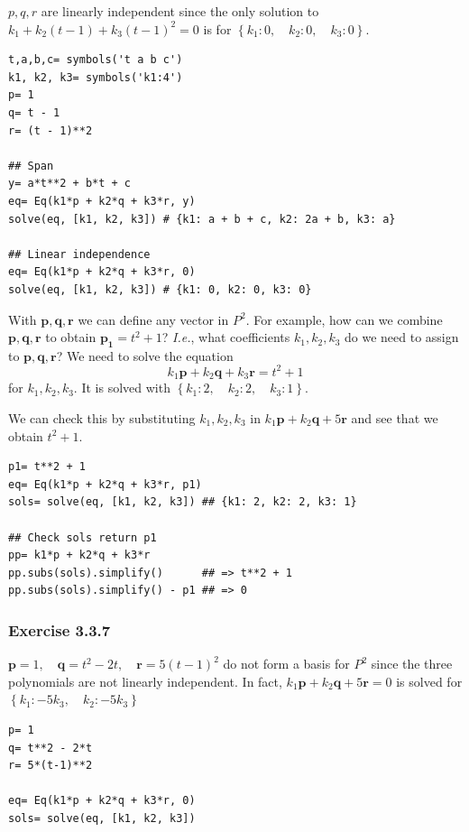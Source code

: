 $p, q, r$ are linearly independent since the only solution to
$k_{1} + k_{2} \left(t - 1\right) + k_{3} \left(t - 1\right)^{2} = 0$ is for
$\left \{ k_{1} : 0, \quad k_{2} : 0, \quad k_{3} : 0\right \}$.

\begin{verbatim}
t,a,b,c= symbols('t a b c')
k1, k2, k3= symbols('k1:4')
p= 1
q= t - 1
r= (t - 1)**2

## Span
y= a*t**2 + b*t + c
eq= Eq(k1*p + k2*q + k3*r, y)
solve(eq, [k1, k2, k3]) # {k1: a + b + c, k2: 2a + b, k3: a}

## Linear independence
eq= Eq(k1*p + k2*q + k3*r, 0)
solve(eq, [k1, k2, k3]) # {k1: 0, k2: 0, k3: 0}
\end{verbatim}

With $\mathbf{p, q, r}$ we can define any vector in $P^2$. For example, how can we
combine $\mathbf{p, q, r}$ to obtain $\mathbf{p_1} = t^{2} + 1$? \emph{I.e.}, what
coefficients $k_1, k_2, k_3$ do we need to assign to $\mathbf{p, q, r}$? We need to
solve the equation
$$
k_{1}\mathbf{p} + k_{2} \mathbf{q} + k_3\mathbf{r} = t^{2} + 1
$$
for $k_1, k_2, k_3$. It is solved with
$\left \{ k_{1} : 2, \quad k_{2} : 2, \quad k_{3} : 1\right \}$.

We can check this by substituting $k_1, k_2, k_3$ in $k_{1}\mathbf{p} + k_{2} \mathbf{q} + 5 \mathbf{r}$
and see that we obtain $t^2 + 1$.

\begin{verbatim}
p1= t**2 + 1
eq= Eq(k1*p + k2*q + k3*r, p1)
sols= solve(eq, [k1, k2, k3]) ## {k1: 2, k2: 2, k3: 1}

## Check sols return p1
pp= k1*p + k2*q + k3*r
pp.subs(sols).simplify()      ## => t**2 + 1
pp.subs(sols).simplify() - p1 ## => 0
\end{verbatim}

\subsubsection{Exercise 3.3.7}

$\mathbf{p}= 1, \quad \mathbf{q}= t^{2} - 2 t, \quad \mathbf{r}= 5 \left(t - 1\right)^{2}$ do not form a basis
for $P^2$ since the three polynomials are not linearly independent. In fact,
$k_{1}\mathbf{p} + k_{2} \mathbf{q} + 5 \mathbf{r} = 0$ is
solved for $\left \{ k_{1} : - 5 k_{3}, \quad k_{2} : - 5 k_{3}\right \}$

\begin{verbatim}
p= 1
q= t**2 - 2*t
r= 5*(t-1)**2

eq= Eq(k1*p + k2*q + k3*r, 0)
sols= solve(eq, [k1, k2, k3])
\end{verbatim}

